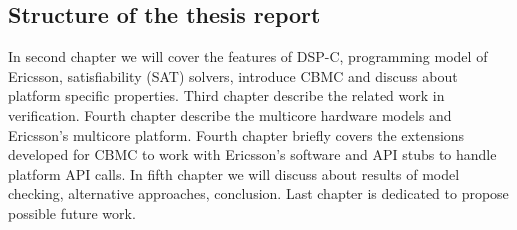
\subsection{Structure of the thesis report}

In second chapter we will cover the features of DSP-C, programming model of Ericsson, satisfiability (SAT) solvers, introduce CBMC and discuss about platform specific properties. Third chapter describe the related work in verification. Fourth chapter describe the multicore hardware models and Ericsson's multicore platform. Fourth chapter briefly covers the extensions developed for CBMC to work with Ericsson's software and API stubs to handle platform API calls. In fifth chapter we will discuss about results of model checking, alternative approaches, conclusion. Last chapter is dedicated to propose possible future work.

